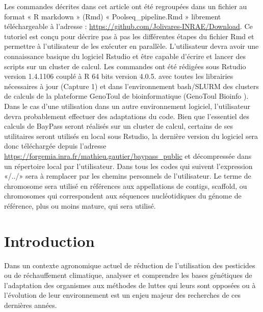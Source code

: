 \documentclass[
  openany]{book}
\theoremstyle{definition}
\theoremstyle{definition}
\theoremstyle{definition}
\theoremstyle{definition}
\theoremstyle{remark}
\begin{document}
Les commandes décrites dans cet article ont été regroupées dans un fichier au format « R markdown » (Rmd) « Poolseq\_pipeline.Rmd » librement téléchargeable à l'adresse : \url{https://github.com/Jolivares-INRAE/Download}. Ce tutoriel est conçu pour décrire pas à pas les différentes étapes du fichier Rmd et permettre à l'utilisateur de les exécuter en parallèle.
L'utilisateur devra avoir une connaissance basique du logiciel Rstudio et être capable d'écrire et lancer des scripts sur un cluster de calcul.
Les commandes ont été rédigées sous Rstudio version 1.4.1106 couplé à R 64 bits version 4.0.5. avec toutes les librairies nécessaires à jour (Capture 1) et dans l'environnement bash/SLURM des clusters de calculs de la plateforme GenoToul de bioinformatique (GenoToul Bioinfo ). Dans le cas d'une utilisation dans un autre environnement logiciel, l'utilisateur devra probablement effectuer des adaptations du code.
Bien que l'essentiel des calculs de BayPass seront réalisés sur un cluster de calcul, certains de ses utilitaires seront utilisés en local sous Rstudio, la dernière version du logiciel sera donc téléchargée depuis l'adresse \url{https://forgemia.inra.fr/mathieu.gautier/baypass_public} et décompressée dans un répertoire local par l'utilisateur.
Dans tous les codes qui suivent l'expression «/../» sera à remplacer par les chemins personnels de l'utilisateur.
Le terme de chromosome sera utilisé en références aux appellations de contigs, scaffold, ou chromosomes qui correspondent aux séquences nucléotidiques du génome de référence, plus ou moins mature, qui sera utilisé.

\hypertarget{introduction}{%
\chapter*{Introduction}\label{introduction}}

Dans un contexte agronomique actuel de réduction de l'utilisation des pesticides ou de réchauffement climatique, analyser et comprendre les bases génétiques de l'adaptation des organismes aux méthodes de luttes qui leurs sont opposées ou à l'évolution de leur environnement est un enjeu majeur des recherches de ces dernières années.
\end{document}
